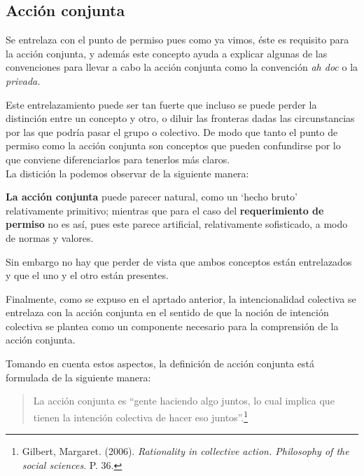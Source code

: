 \documentclass[oneside]{book}
\begin{document}
\subsection{Acción conjunta}



Se entrelaza con el punto de permiso pues como ya vimos, éste es requisito para la acción conjunta, y además este concepto ayuda a explicar algunas de las convenciones para llevar a cabo la acción conjunta como la convención \textit{ah doc} o  la \textit{privada.} 

Este entrelazamiento puede ser tan fuerte que incluso se puede perder la distinción entre un concepto y otro, o diluir las fronteras dadas las circunstancias por las que podría pasar el grupo o colectivo. De modo que tanto el punto de permiso como la acción conjunta son conceptos que pueden confundirse por lo que conviene diferenciarlos para tenerlos más claros.
\\

La distición la podemos observar de la siguiente manera: 

\textbf{La acción conjunta} puede parecer natural, como un ‘hecho bruto’ relativamente primitivo; mientras que para el caso del \textbf{requerimiento de permiso} no es así, pues este parece artificial, relativamente sofisticado, a modo de normas y valores.

Sin embargo no hay que perder de vista que ambos conceptos están entrelazados y que el uno y el otro están presentes. 

Finalmente, como se expuso en el aprtado anterior, la intencionalidad colectiva se entrelaza con la acción conjunta en el sentido de que la noción de intención colectiva se plantea como un componente necesario para la comprensión de la acción conjunta.

Tomando en cuenta estos aspectos, la definición de acción conjunta está formulada de la siguiente manera:
\begin{quote}
La acción conjunta es ``gente haciendo algo juntos, lo cual implica que tienen la intención colectiva de hacer eso juntos''.\footnote{Gilbert, Margaret. (2006). \textit{Rationality in collective action. Philosophy of the social sciences}. P. 36.}
\end{quote}
\end{document}
